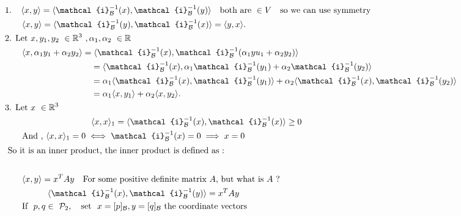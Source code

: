 \documentclass[
12pt,
]{article}
\newcommand{\la}{\langle}
\newcommand{\ra}{\rangle}
\theoremstyle{definition}
\theoremstyle{definition}
\theoremstyle{definition}
\theoremstyle{definition}
\begin{document}
\begin{align*}
		&\text{1. } \ \ \la x,y \ra = \la  \mathcal{i}_{\mathcal{B}}^{-1} (x) ,  \mathcal{i}_{\mathcal{B}}^{-1} (y) \ra \quad \text{both are } \in V \quad \text{so we can use symmetry} \\
		&\hspace{20pt}\la x,y \ra = \la  \mathcal{i}_{\mathcal{B}}^{-1} (y) ,  \mathcal{i}_{\mathcal{B}}^{-1} (x) \ra  = \la y,x \ra. \\
		&\text {2. } \text{Let } x,y_1, y_2 \ \in \mathbb{R}^3 \ , \alpha_1, \alpha_2 \ \in \mathbb{R} \\
		&\hspace{20pt} \la x, \alpha_1 y_1 + \alpha_2 y_2 \ra = \la  \mathcal{i}_{\mathcal{B}}^{-1} (x) ,  \mathcal{i}_{\mathcal{B}}^{-1} (\alpha_1 yu_1 + \alpha_2 y_2) \ra \\
		&\hspace{101pt}= \la  \mathcal{i}_{\mathcal{B}}^{-1} (x), \alpha_1  \mathcal{i}_{\mathcal{B}}^{-1} (y_1) + \alpha_2  \mathcal{i}_{\mathcal{B}}^{-1} (y_2) \ra \\
		&\hspace{101pt} = \alpha_1 \la  \mathcal{i}_{\mathcal{B}}^{-1} (x),  \mathcal{i}_{\mathcal{B}}^{-1} (y_1) \ra + \alpha_2 \la  \mathcal{i}_{\mathcal{B}}^{-1} (x) ,  \mathcal{i}_{\mathcal{B}}^{-1} (y_2) \ra \\
		&\hspace{101pt} = \alpha_1 \la x, y_1 \ra + \alpha_2 \la x, y_2 \ra.\\
		&\text{3. } \text{Let } x \ \in \mathbb{R}^3 \\
		&\hspace{101pt} \la x,x \ra_1 = \la  \mathcal{i}_{\mathcal{B}}^{-1} (x) ,  \mathcal{i}_{\mathcal{B}}^{-1} (x) \ra \geq 0\\
		& \hspace{20pt} \text{And , } \la x,x \ra_1 = 0 \iff  \mathcal{i}_{\mathcal{B}}^{-1} (x) = 0 \implies x = 0 \\
		\intertext{ So it is an inner product, the inner product is defined as : } \\
		&\hspace{20pt} \la x ,y \ra = x^{T} A y \quad \text{For some positive definite matrix $A$, but what is $A$ ?} \\
		&\hspace{50pt}\la  \mathcal{i}_{\mathcal{B}}^{-1} (x),  \mathcal{i}_{\mathcal{B}}^{-1} (y) \ra = x^{T} A y \\
		&\hspace{20pt}\text{If } \ p,q \in \ \mathcal{P}_2 , \quad \text{set } \ x = [p]_{\mathcal{B}}, y = [q]_{\mathcal{B}} \ \text{the coordinate vectors} \\

\end{align*}
\end{document}
